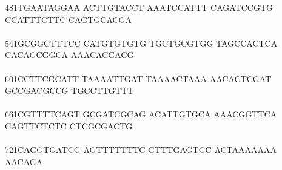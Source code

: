 \documentclass[11pt,twoside,reqno,a4paper]{article}
\begin{document}
{481\hspace*{1\charwidth}TGAATAGGAA	ACTTGTACCT	AAATCCATTT	CAGATCCGTG	CCATTTCTTC	CAGTGCACGA	\\
\hspace*{4\charwidth}\hspace*{1\charwidth}\hspace*{1\charwidth}\hspace*{1\charwidth}\hspace*{1\charwidth}\hspace*{1\charwidth}\hspace*{1\charwidth}\\
541\hspace*{1\charwidth}GCGGCTTTCC	CATGTGTGTG	TGCTGCGTGG	TAGCCACTCA	CACAGCGGCA	AAACACGACG	\\
\hspace*{4\charwidth}\hspace*{1\charwidth}\hspace*{1\charwidth}\hspace*{1\charwidth}\hspace*{1\charwidth}\hspace*{1\charwidth}\hspace*{1\charwidth}\\
601\hspace*{1\charwidth}CCTTCGCATT	TAAAATTGAT	TAAAACTAAA	AACACTCGAT	GCCGACGCCG	TGCCTTGTTT	\\
\hspace*{4\charwidth}\hspace*{1\charwidth}\hspace*{1\charwidth}\hspace*{1\charwidth}\hspace*{1\charwidth}\hspace*{1\charwidth}\hspace*{1\charwidth}\\
661\hspace*{1\charwidth}CGTTTTCAGT	GCGATCGCAG	ACATTGTGCA	AAACGGTTCA	CAGTTCTCTC	CTCGCGACTG	\\
\hspace*{4\charwidth}\hspace*{1\charwidth}\hspace*{1\charwidth}\hspace*{1\charwidth}\hspace*{1\charwidth}\hspace*{1\charwidth}\hspace*{1\charwidth}\\
721\hspace*{1\charwidth}CAGGTGATCG	AGTTTTTTTC	GTTTGAGTGC	ACTAAAAAAA	AACAGA\\
\hspace*{4\charwidth}\hspace*{1\charwidth}\hspace*{1\charwidth}\hspace*{1\charwidth}\hspace*{1\charwidth}\\
}
\end{document}
